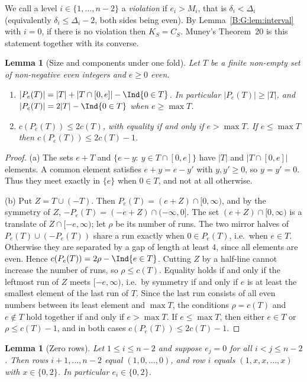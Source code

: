 \documentclass[11pt,a4paper]{article}
\newtheorem{lemma}[theorem]{Lemma}
\theoremstyle{definition}
\theoremstyle{remark}
\numberwithin{equation}{section}
\begin{document}
We call a level $i\in\{1,\dots,n-2\}$ a \emph{violation} if $e_i>M_i$, that is
$\delta_i<\Delta_i$ (equivalently $\delta_i\le\Delta_i-2$, both sides being even). By
Lemma~\ref{B:G:lem:interval} with $i=0$, if there is no violation then $K_S=C_S$. Muney's
Theorem~20 \cite{R003} is this statement together with its converse.

\begin{lemma}[Size and components under one fold]\label{B:G:lem:Pe}
Let $T$ be a finite non-empty set of non-negative even integers and $e\ge0$ even.
\begin{enumerate}
\item[(a)] $|P_e(T)|=|T|+|T\cap[0,e]|-\Ind{0\in T}$. In particular $|P_e(T)|\ge|T|$, and
$|P_e(T)|=2|T|-\Ind{0\in T}$ when $e\ge\max T$.
\item[(b)] $c(P_e(T))\le2c(T)$, with equality if and only if $e>\max T$. If $e\le\max T$ then
$c(P_e(T))\le2c(T)-1$.
\end{enumerate}
\end{lemma}

\begin{proof}
(a) The sets $e+T$ and $\{e-y:\ y\in T\cap[0,e]\}$ have $|T|$ and $|T\cap[0,e]|$ elements. A
common element satisfies $e+y=e-y'$ with $y,y'\ge0$, so $y=y'=0$. Thus they meet exactly in $\{e\}$
when $0\in T$, and not at all otherwise.

(b) Put $Z=T\cup(-T)$. Then $P_e(T)=(e+Z)\cap[0,\infty)$, and by the symmetry of $Z$,
$-P_e(T)=(-e+Z)\cap(-\infty,0]$. The set $(e+Z)\cap[0,\infty)$ is a translate of
$Z\cap[-e,\infty)$; let $\rho$ be its number of runs. The two mirror halves of
$P_e(T)\cup(-P_e(T))$ share a run exactly when $0\in P_e(T)$, i.e.\ when $e\in T$. Otherwise they
are separated by a gap of length at least $4$, since all elements are even. Hence
$c(P_e(T))=2\rho-\Ind{e\in T}$. Cutting $Z$ by a half-line cannot increase the number of runs, so
$\rho\le c(T)$. Equality holds if and only if the leftmost run of $Z$ meets $[-e,\infty)$, i.e.\ by
symmetry if and only if $e$ is at least the smallest element of the last run of $T$. Since the last
run consists of all even numbers between its least element and $\max T$, the conditions
$\rho=c(T)$ and $e\notin T$ hold together if and only if $e>\max T$. If $e\le\max T$, then either
$e\in T$ or $\rho\le c(T)-1$, and in both cases $c(P_e(T))\le2c(T)-1$.
\end{proof}

\begin{lemma}[Zero rows]\label{B:G:lem:zero}
Let $1\le i\le n-2$ and suppose $e_j=0$ for all $i<j\le n-2$. Then rows $i+1,\dots,n-2$ equal
$(1,0,\dots,0)$, and row $i$ equals $(1,x,x,\dots,x)$ with $x\in\{0,2\}$. In particular
$e_i\in\{0,2\}$.
\end{lemma}
\end{document}
